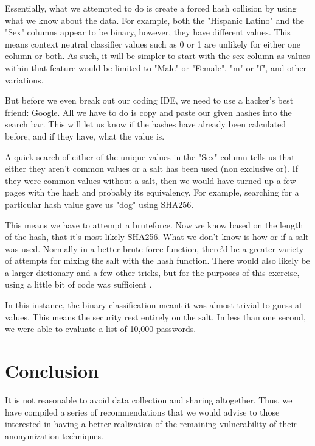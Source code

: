 \documentclass[10pt,journal,compsoc]{IEEEtran}
\begin{document}
Essentially, what we attempted to do is create a forced hash collision by using what we know about the data. For example, both the "Hispanic Latino" and the "Sex" columns appear to be binary, however, they have different values. This means context neutral classifier values such as 0 or 1 are unlikely for either one column or both. As such, it will be simpler to start with the sex column as values within that feature would be limited to "Male" or "Female", "m" or "f", and other variations.

But before we even break out our coding IDE, we need to use a hacker's best friend: Google. All we have to do is copy and paste our given hashes into the search bar. This will let us know if the hashes have already been calculated before, and if they have, what the value is.

A quick search of either of the unique values in the "Sex" column tells us that either they aren't common values or a salt has been used (non exclusive or). If they were common values without a salt, then we would have turned up a few pages with the hash and probably its equivalency. For example, searching for a particular hash value gave us "dog" using SHA256.

This means we have to attempt a bruteforce. Now we know based on the length of the hash, that it's most likely SHA256. What we don't know is how or if a salt was used. Normally in a better brute force function, there'd be a greater variety of attempts for mixing the salt with the hash function. There would also likely be a larger dictionary and a few other tricks, but for the purposes of this exercise, using a little bit of code was sufficient \cite{frye}.

In this instance, the binary classification meant it was almost trivial to guess at values.  This means the security rest entirely on the salt.  In less than one second, we were able to evaluate a list of 10,000 passwords.


	

\section{Conclusion}

	It is not reasonable to avoid data collection and sharing altogether.  Thus, we have compiled a series of recommendations that we would advise to those interested in having a better realization of the remaining vulnerability of their anonymization techniques.\linebreak
	
\end{document}
